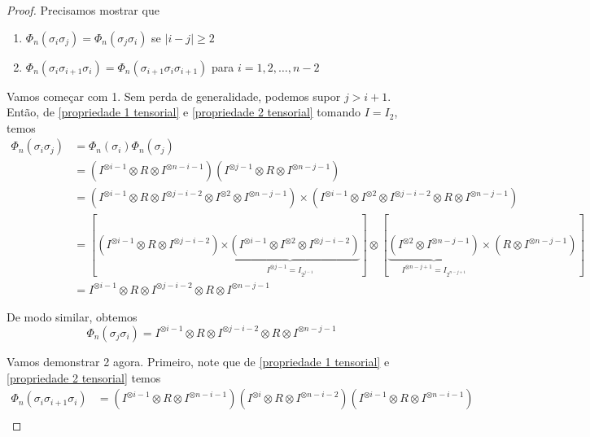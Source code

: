 \documentclass[a4paper,portuguese,11pt,twoside, leqno]{book}
\theoremstyle{definition}
\begin{document}
	\begin{proof}
		Precisamos mostrar que 
		\begin{enumerate}
			\item $\Phi_n(\sigma_i\sigma_j) = \Phi_n(\sigma_j\sigma_i)$ se $|i-j|\geq 2$
			\item $\Phi_n(\sigma_i\sigma_{i+1}\sigma_i) = \Phi_n(\sigma_{i+1}\sigma_i\sigma_{i+1})$ para $i=1,2,\dots, n-2$
		\end{enumerate}
		\par\vspace{0.3cm} Vamos começar com 1. Sem perda de generalidade, podemos supor $j>i+1$. Então, de \eqref{propriedade 1 tensorial} e \eqref{propriedade 2 tensorial} tomando $I = I_2$, temos
		\begin{align*}
		\Phi_n(\sigma_i\sigma_j) &= \Phi_n(\sigma_i)\Phi_n(\sigma_j) \\
		&= (I^{\otimes i-1} \otimes R \otimes I^{\otimes n-i-1})( I^{\otimes j-1} \otimes R \otimes I^{\otimes n-j-1} ) \\
		&= ( I^{\otimes i-1} \otimes R \otimes I^{\otimes j-i-2}\otimes I^{\otimes 2} \otimes I^{\otimes n-j-1}  ) \times (I^{\otimes i-1} \otimes I^{\otimes 2} \otimes I^{\otimes j-i-2} \otimes R \otimes I^{\otimes n-j-1} ) \\
		&=  [(I^{\otimes i-1} \otimes R \otimes I^{\otimes j-i-2})\underbrace{\times(I^{\otimes i-1}\otimes I^{\otimes 2} \otimes I^{\otimes j-i-2})}_{I^{\otimes j-1} = I_{2^{j-1}}}]\otimes [\underbrace{(I^{\otimes 2} \otimes I^{\otimes n-j-1})}_{I^{\otimes n-j+1} = I_{2^{n-j+1}}  }\times(R \otimes I^{\otimes n-j-1})] \\
		&= I^{\otimes i-1} \otimes R \otimes I^{\otimes j-i-2} \otimes R \otimes I^{\otimes n-j-1}
		\end{align*} 
		\par\vspace{0.3cm} De modo similar, obtemos
		\begin{equation*}
		\Phi_n(\sigma_j\sigma_i) = I^{\otimes i-1} \otimes R \otimes I^{\otimes j-i-2} \otimes R \otimes I^{\otimes n-j-1}
		\end{equation*}
		\par\vspace{0.3cm} Vamos demonstrar 2 agora. Primeiro, note que de \eqref{propriedade 1 tensorial} e \eqref{propriedade 2 tensorial} temos
		\begin{align*}
		\Phi_n(\sigma_i\sigma_{i+1}\sigma_i) &= (I^{\otimes i-1} \otimes R \otimes I^{\otimes n-i-1}) (I^{\otimes i} \otimes R \otimes I^{\otimes n-i-2}) (I^{\otimes i-1} \otimes R \otimes I^{\otimes n-i-1}) \\

\end{align*}
\end{proof}
\end{document}
